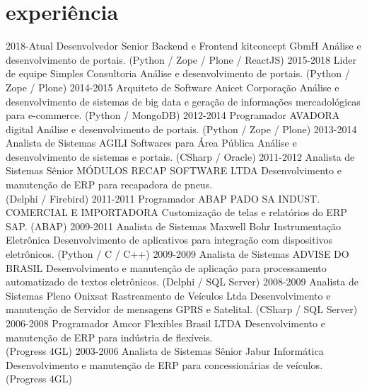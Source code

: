 \documentclass[]{twentysecondcv}
\begin{document}
\section{experiência}

\begin{twenty}
  \twentyitem
    {2018-Atual}
    {Desenvolvedor Senior Backend e Frontend}
    {kitconcept GbmH}
    {Análise e desenvolvimento de portais. (Python / Zope / Plone / ReactJS)}
  \twentyitem
    {2015-2018}
    {Lider de equipe}
    {Simples Consultoria}
    {Análise e desenvolvimento de portais. (Python / Zope / Plone)}
  \twentyitem
    {2014-2015}
    {Arquiteto de Software}
    {Anicet Corporação}
    {Análise e desenvolvimento de sistemas de big data e geração de informações mercadológicas para e-commerce. (Python / MongoDB)}
  \twentyitem
    {2012-2014}
    {Programador}
    {AVADORA digital}
    {Análise e desenvolvimento de portais. (Python / Zope / Plone)}
  \twentyitem
    {2013-2014}
    {Analista de Sistemas}
    {AGILI Softwares para Área Pública}
    {Análise e desenvolvimento de sistemas e portais. (CSharp / Oracle)}
  \twentyitem
    {2011-2012}
    {Analista de Sistemas Sênior}
    {MÓDULOS RECAP SOFTWARE LTDA}
    {Desenvolvimento e manutenção de ERP para recapadora de pneus.\\
    (Delphi / Firebird)}
  \twentyitem
    {2011-2011}
    {Programador ABAP}
    {PADO SA INDUST. COMERCIAL E IMPORTADORA}
    {Customização de telas e relatórios do ERP SAP. (ABAP)}
  \twentyitem
    {2009-2011}
    {Analista de Sistemas}
    {Maxwell Bohr Instrumentação Eletrônica}
    {Desenvolvimento de aplicativos para integração com dispositivos eletrônicos. (Python / C / C++)}
  \twentyitem
    {2009-2009}
    {Analista de Sistemas}
    {ADVISE DO BRASIL}
    {Desenvolvimento e manutenção de aplicação para processamento automatizado de textos eletrônicos. (Delphi / SQL Server)}
  \twentyitem
    {2008-2009}
    {Analista de Sistemas Pleno}
    {Onixsat Rastreamento de Veículos Ltda}
    {Desenvolvimento e manutenção de Servidor de mensagens GPRS e Satelital. (CSharp / SQL Server)}
  \twentyitem
    {2006-2008}
    {Programador}
    {Amcor Flexibles Brasil LTDA}
    {Desenvolvimento e manutenção de ERP para indústria de flexíveis.\\
    (Progress 4GL)}
  \twentyitem
    {2003-2006}
    {Analista de Sistemas Sênior}
    {Jabur Informática}
    {Desenvolvimento e manutenção de ERP para concessionárias de veículos.\\
    (Progress 4GL)}
\end{twenty}
\end{document}
